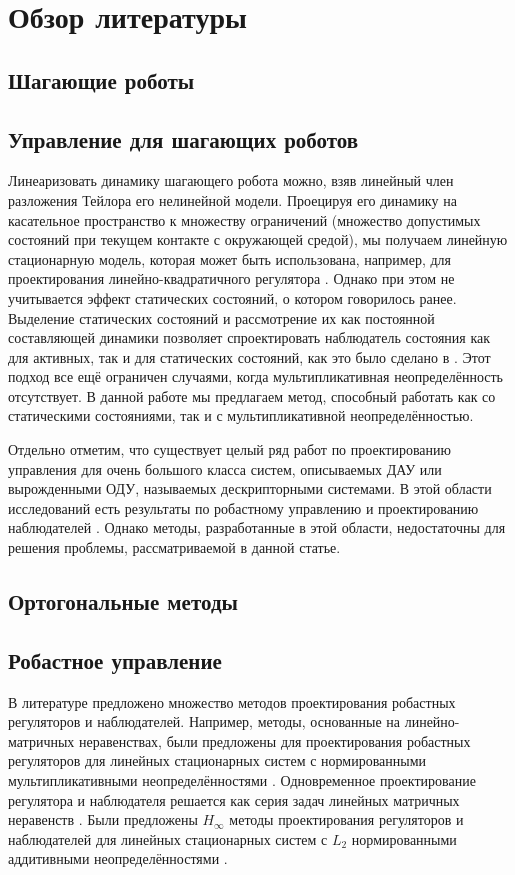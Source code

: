 \chapter{Обзор литературы}\label{ch:ch1}

\section{Шагающие роботы}\label{sec:ch1/sec1}
\section{Управление для шагающих роботов}\label{sec:ch1/sec2}
Линеаризовать динамику шагающего робота можно, взяв линейный член разложения Тейлора его нелинейной модели. Проецируя его динамику на касательное пространство к множеству ограничений (множество допустимых состояний при текущем контакте с окружающей средой), мы получаем линейную стационарную модель, которая может быть использована, например, для проектирования линейно-квадратичного регулятора \cite{mason2014full}. Однако при этом не учитывается эффект статических состояний, о котором говорилось ранее. Выделение статических состояний и рассмотрение их как постоянной составляющей динамики позволяет спроектировать наблюдатель состояния как для активных, так и для статических состояний, как это было сделано в \cite{SAVIN2021}. Этот подход все ещё ограничен случаями, когда мультипликативная неопределённость отсутствует. В данной работе мы предлагаем метод, способный работать как со статическими состояниями, так и с мультипликативной неопределённостью.

Отдельно отметим, что существует целый ряд работ по проектированию управления для очень большого класса систем, описываемых ДАУ или вырожденными ОДУ, называемых дескрипторными системами. В этой области исследований есть результаты по робастному управлению и проектированию наблюдателей \cite{Cheng2018, Darouach2014}. Однако методы, разработанные в этой области, недостаточны для решения проблемы, рассматриваемой в данной статье.

\section{Ортогональные методы}\label{sec:ch1/sec3}

\section{Робастное управление}\label{sec:ch1/sec4}
В литературе предложено множество методов проектирования робастных регуляторов и наблюдателей. Например, методы, основанные на линейно-матричных неравенствах, были предложены для проектирования робастных регуляторов для линейных стационарных систем с нормированными мультипликативными неопределённостями \cite{POLYAK2021,ROTONDO2014}.
Одновременное проектирование регулятора и наблюдателя решается как серия задач линейных матричных неравенств \cite{ZEMOUCHE2015,GRITLI2021}. Были предложены $H_\infty$ методы проектирования регуляторов и наблюдателей для линейных стационарных систем с $L_2$ нормированными аддитивными неопределённостями \cite{Bennani2019, KHELOUFI2016}.


